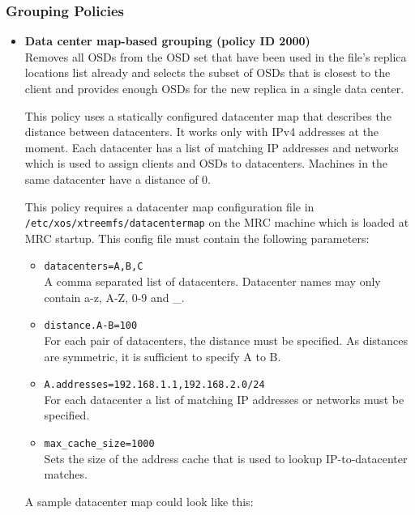 \documentclass[a4paper,10pt]{book}
\begin{document}
\subsubsection{Grouping Policies}

\begin{itemize}

 \item \textbf{Data center map-based grouping (policy ID 2000)}\\
 Removes all OSDs from the OSD set that have been used in the file's replica locations list already and selects the subset of OSDs that is closest to the client and provides enough OSDs for the new replica in a single data center.

 This policy uses a statically configured datacenter map that describes the distance between datacenters. It works only with IPv4 addresses at the moment. Each datacenter has a list of matching IP addresses and networks which is used to assign clients and OSDs to datacenters. Machines in the same datacenter have a distance of 0.

	This policy requires a datacenter map configuration file in\\
	\texttt{/etc/xos/xtreemfs/datacentermap} on the MRC machine which is loaded at MRC startup. This config file must contain the following parameters:
	\begin{itemize}
		\item \texttt{datacenters=A,B,C}\\
			A comma separated list of datacenters. Datacenter names may only contain a-z, A-Z, 0-9 and \_.

		\item \texttt{distance.A-B=100}\\
			For each pair of datacenters, the distance must be specified. As distances are symmetric, it is sufficient to specify A to B.

		\item \texttt{A.addresses=192.168.1.1,192.168.2.0/24}\\
			For each datacenter a list of matching IP addresses or networks must be specified.

		\item \texttt{max\_cache\_size=1000}\\
			Sets the size of the address cache that is used to lookup IP-to-datacenter matches.
	\end{itemize}

	A sample datacenter map could look like this:


\end{itemize}
\end{document}
